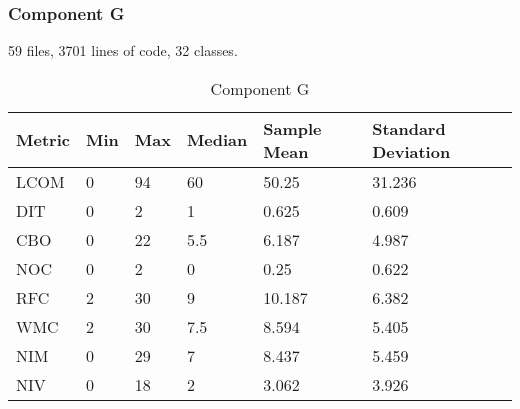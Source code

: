 \subsubsection{Component G}
59 files, 3701 lines of code, 32 classes.
\begin{table}[]
\centering
\caption{Component G}
\label{tab:oometrics-guri}
\begin{tabular}{|l|l|l|l|l|l|}
\hline
\textbf{Metric} & \textbf{Min} & \textbf{Max} & \textbf{Median} & \textbf{Sample Mean} & \textbf{Standard Deviation} \\ \hline
LCOM            & 0            & 94           & 60              & 50.25                & 31.236                      \\ \hline
DIT             & 0            & 2            & 1               & 0.625                & 0.609                       \\ \hline
CBO             & 0            & 22           & 5.5             & 6.187                & 4.987                       \\ \hline
NOC             & 0            & 2            & 0               & 0.25                 & 0.622                       \\ \hline
RFC             & 2            & 30           & 9               & 10.187               & 6.382                       \\ \hline
WMC             & 2            & 30           & 7.5             & 8.594                & 5.405                       \\ \hline
NIM             & 0            & 29           & 7               & 8.437                & 5.459                       \\ \hline
NIV             & 0            & 18           & 2               & 3.062                & 3.926                       \\ \hline
\end{tabular}
\end{table}











